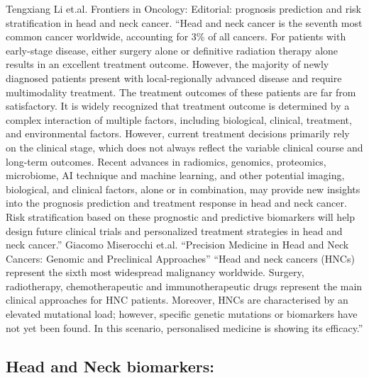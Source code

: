 \documentclass{article}%
\begin{document}
\newline%
\newline%
%
Tengxiang Li et.al. Frontiers in Oncology: Editorial: prognosis prediction and risk stratification in head and neck cancer. %
\newline%
\newline%
%
“Head and neck cancer is the seventh most common cancer worldwide, accounting for 3\% of all cancers. For patients with early{-}stage disease, either surgery alone or definitive radiation therapy alone results in an excellent treatment outcome. However, the majority of newly diagnosed patients present with local{-}regionally advanced disease and require multimodality treatment. The treatment outcomes of these patients are far from satisfactory. It is widely recognized that treatment outcome is determined by a complex interaction of multiple factors, including biological, clinical, treatment, and environmental factors. However, current treatment decisions primarily rely on the clinical stage, which does not always reflect the variable clinical course and long{-}term outcomes. Recent advances in radiomics, genomics, proteomics, microbiome, AI technique and machine learning, and other potential imaging, biological, and clinical factors, alone or in combination, may provide new insights into the prognosis prediction and treatment response in head and neck cancer. Risk stratification based on these prognostic and predictive biomarkers will help design future clinical trials and personalized treatment strategies in head and neck cancer.”%
\newline%
\newline%
%
Giacomo Miserocchi et.al. “Precision Medicine in Head and Neck Cancers: Genomic and Preclinical Approaches”%
\newline%
\newline%
%
“Head and neck cancers (HNCs) represent the sixth most widespread malignancy worldwide. Surgery, radiotherapy, chemotherapeutic and immunotherapeutic drugs represent the main clinical approaches for HNC patients. Moreover, HNCs are characterised by an elevated mutational load; however, specific genetic mutations or biomarkers have not yet been found. In this scenario, personalised medicine is showing its efficacy.”%
\newline%
\newline%
%
\subsection{Head and Neck biomarkers:}%
\label{subsec:HeadandNeckbiomarkers}%
\end{document}
